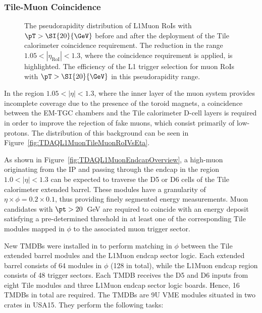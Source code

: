 \documentclass[cernpreprint, atlasdraft=false, UKenglish,british,orcidlogo, texmf, orcidlogo]{atlasdoc}
\begin{document}
\subsubsection{Tile-Muon Coincidence}
 
\begin{figure}[htbp!]
\centering
{}
\caption{
\protect{} The pseudorapidity distribution of \RunTwo \gls{L1Muon} \glspl{RoI} with $\pT > \SI{20}{\GeV}$ before and after the deployment of the Tile calorimeter coincidence requirement.  The reduction in the range $1.05 < |\eta_{\mathrm{RoI}}| < 1.3$, where the coincidence requirement is applied, is highlighted.
\protect{} The efficiency of the \RunTwo \gls{L1} trigger selection for muon \glspl{RoI} with $\pT > \SI{20}{\GeV}$ in this pseudorapidity range.
}
\label{fig:TDAQL1MuonTileMuonPerformance}
\end{figure}
 
In the region $1.05 < |\eta| < 1.3$, where the inner layer of the muon system provides incomplete coverage due to the presence of the toroid magnets, a coincidence between the \gls{EM-TGC} chambers and the Tile calorimeter D-cell layers is required in order to improve the rejection of fake muons, which consist primarily of low-\pt protons.  The distribution of this background can be seen in Figure~\ref{fig:TDAQL1MuonTileMuonRoIVsEta}.
 
As shown in Figure~\ref{fig:TDAQL1MuonEndcapOverview}, a high-\pt muon originating from the \gls{IP} and passing through the endcap in the region $1.0 < |\eta| < 1.3$ can be expected to traverse the D5 or D6 cells of the Tile calorimeter extended barrel.  These modules have a granularity of $\eta \times \phi = 0.2 \times 0.1$, thus providing finely segmented energy measurements.  Muon candidates with $\pt > 20$~GeV are required to coincide with an energy deposit satisfying a pre-determined threshold in at least one of the corresponding Tile modules mapped in $\phi$ to the associated muon trigger sector.
 
New \glspl{TMDB} were installed in \RunTwo to perform matching in $\phi$ between the Tile extended barrel modules and the \gls{L1Muon} endcap sector logic.  Each extended barrel consists of 64 modules in $\phi$ (128 in total), while the \gls{L1Muon} endcap region consists of 48 trigger sectors.  Each \gls{TMDB} receives the D5 and D6 inputs from eight Tile modules and three \gls{L1Muon} endcap sector logic boards.  Hence, 16 \glspl{TMDB} in total are required.  The \glspl{TMDB} are 9U \gls{VME} modules situated in two crates in \gls{USA15}.  They perform the following tasks:
 
\end{document}
